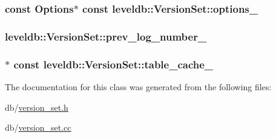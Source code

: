 \hypertarget{classleveldb_1_1_version_set_a820c01d5891293ae45b8efb0f14b1278}{
\subsubsection[{options\-\_\-}]{\setlength{\rightskip}{0pt plus 5cm}const {\bf Options}$\ast$ const leveldb\-::\-Version\-Set\-::options\-\_\-\hspace{0.3cm}{\ttfamily [private]}}}\label{classleveldb_1_1_version_set_a820c01d5891293ae45b8efb0f14b1278}
\hypertarget{classleveldb_1_1_version_set_a9ccd7e180391e89ee509825c5f12403d}{
\subsubsection[{prev\-\_\-log\-\_\-number\-\_\-}]{ leveldb\-::\-Version\-Set\-::prev\-\_\-log\-\_\-number\-\_\-\hspace{0.3cm}{\ttfamily [private]}}}\label{classleveldb_1_1_version_set_a9ccd7e180391e89ee509825c5f12403d}
\hypertarget{classleveldb_1_1_version_set_afaca99abf7dea9ca06bc9dbb2f0a9ebe}{
\subsubsection[{table\-\_\-cache\-\_\-}]{$\ast$ const leveldb\-::\-Version\-Set\-::table\-\_\-cache\-\_\-\hspace{0.3cm}{\ttfamily [private]}}}\label{classleveldb_1_1_version_set_afaca99abf7dea9ca06bc9dbb2f0a9ebe}


The documentation for this class was generated from the following files\-:\begin{DoxyCompactItemize}
\item 
db/\hyperlink{version__set_8h}{version\-\_\-set.\-h}\item 
db/\hyperlink{version__set_8cc}{version\-\_\-set.\-cc}\end{DoxyCompactItemize}
